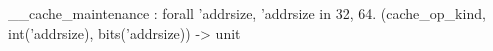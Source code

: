 __cache_maintenance : forall 'addrsize, 'addrsize in {32, 64}. (cache_op_kind, int('addrsize), bits('addrsize)) -> unit